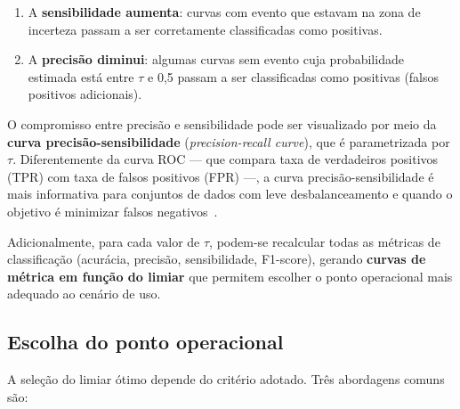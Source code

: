 \documentclass[msc]{on} %
\begin{document}
\begin{enumerate}
	\item A \textbf{sensibilidade aumenta}: curvas com evento que estavam na zona de incerteza passam a ser corretamente classificadas como positivas.
	\item A \textbf{precisão diminui}: algumas curvas sem evento cuja probabilidade estimada está entre $\tau$ e 0,5 passam a ser classificadas como positivas (falsos positivos adicionais).
\end{enumerate}

O compromisso entre precisão e sensibilidade pode ser visualizado por meio da \textbf{curva precisão-sensibilidade} (\textit{precision-recall curve}), que é parametrizada por $\tau$. Diferentemente da curva ROC --- que compara taxa de verdadeiros positivos (TPR) com taxa de falsos positivos (FPR) ---, a curva precisão-sensibilidade é mais informativa para conjuntos de dados com leve desbalanceamento e quando o objetivo é minimizar falsos negativos~\citep{Saito2015}.

Adicionalmente, para cada valor de $\tau$, podem-se recalcular todas as métricas de classificação (acurácia, precisão, sensibilidade, F1-score), gerando \textbf{curvas de métrica em função do limiar} que permitem escolher o ponto operacional mais adequado ao cenário de uso.

\subsection{Escolha do ponto operacional}

A seleção do limiar ótimo depende do critério adotado. Três abordagens comuns são:
\end{document}
